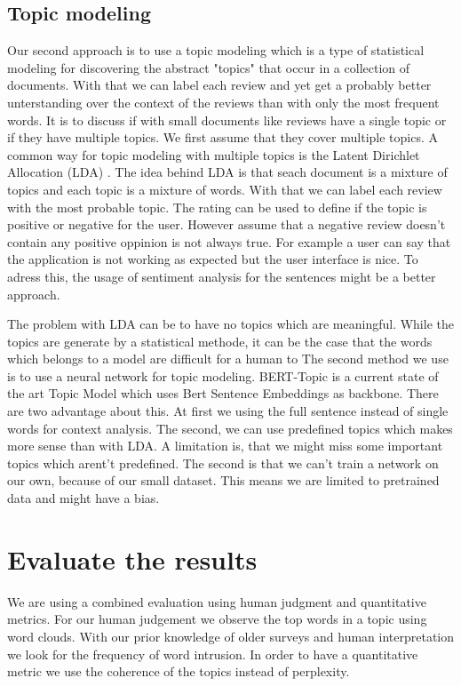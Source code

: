 \subsection{Topic modeling}
Our second approach is to use a topic modeling which is a type of statistical modeling for discovering the abstract "topics" that occur in a collection of documents.
With that we can label each review and yet get a probably better unterstanding over the context of the reviews than with only the most frequent words.
It is to discuss if with small documents like reviews have a single topic or if they have multiple topics.
We first assume that they cover multiple topics.
A common way for topic modeling with multiple topics is the Latent Dirichlet Allocation (LDA) \cite{blei2003latent}.
The idea behind LDA is that seach document is a mixture of topics and each topic is a mixture of words.
With that we can label each review with the most probable topic. The rating can be used to define if the topic is positive or negative for the user.
However assume that a negative review doesn't contain any positive oppinion is not always true.
For example a user can say that the application is not working as expected but the user interface is nice.
To adress this, the usage of sentiment analysis for the sentences might be a better approach.

The problem with LDA can be to have no topics which are meaningful.
While the topics are generate by a statistical methode, it can be the case that the words which belongs to a model are difficult for a human to
The second method we use is to use a neural network for topic modeling.
BERT-Topic \cite{grootendorst2022bertopic} is a current state of the art Topic Model which uses Bert Sentence Embeddings \cite{reimers2019sentence} as backbone. There are two advantage about this. At first we using the full sentence instead of single words for context analysis.
The second, we can use predefined topics which makes more sense than with LDA.
A limitation is, that we might miss some important topics which arent't predefined.
The second is that we can't train a network on our own, because of our small dataset. This means we are limited to pretrained data and might have a bias.

\section{Evaluate the results}
We are using a combined evaluation using human judgment and quantitative metrics.
For our human judgement we observe the top words in a topic using word clouds. 
With our prior knowledge of older surveys and human interpretation we look for the frequency of word intrusion.
In order to have a quantitative metric we use the coherence of the topics instead of perplexity.

